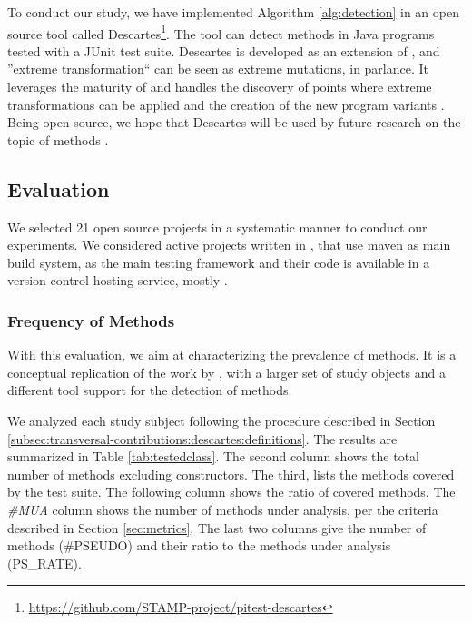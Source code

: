 To conduct our study, we have implemented Algorithm \ref{alg:detection} in an open source tool called Descartes\footnote{\url{https://github.com/STAMP-project/pitest-descartes}}. 
The tool can detect \pseudotested{} methods in Java programs tested with a JUnit test suite.
Descartes is developed as an extension of \pit{} \cite{coles_pit_2016}, and ''extreme transformation`` can be seen as extreme mutations, in \pit parlance.
It leverages the maturity of \pit{} and handles the discovery of points where extreme transformations can be applied and the creation of the new program variants \cite{veraperez2018descartes}.
Being open-source, we hope that Descartes  will be used by future research on the topic of \pseudotested{} methods .

\subsection{Evaluation}
\label{subsec:transversal-contributions:descartes:evaluation}

We selected 21 open source projects in a systematic manner to conduct our experiments. 
We considered active projects written in \java{}, that use maven as main build system, \junit{} as the main testing framework and their code is available in a version control hosting service, mostly \gh.

\subsubsection{Frequency of \pseudotested Methods}
\label{subsubsec:transversal-contributions:descartes:evaluation:frequency}

With this evaluation, we aim at characterizing the prevalence of \pseudotested{} methods. 
It is a conceptual replication of the work by \theoriginalauthors, with a larger set of study objects and a different tool support for the detection of \pseudotested{} methods.

We analyzed each study subject following the procedure described in Section \ref{subsec:transversal-contributions:descartes:definitions}. The results are summarized in Table \ref{tab:testedclass}. The second column shows the total number of methods excluding constructors. The third, lists the methods covered by the test suite. The following column shows the ratio of covered methods. The \textit{\#MUA} column shows the number of methods under analysis, per the criteria described in Section \ref{sec:metrics}. The last two columns give the number of \pseudotested{} methods (\#PSEUDO) and their ratio to the methods under analysis (PS\_RATE).

